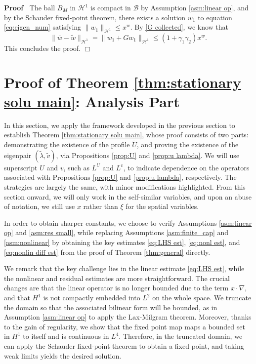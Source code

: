 \documentclass[11pt,a4paper]{article}
\numberwithin{equation}{section}
\newenvironment{proof}{\noindent\textbf{Proof\ }}{\hspace*{\fill}$\Box$\medskip}
\begin{document}
\begin{proof}
    The ball $B_{M}$ in $\mathcal{H}^1$ is compact in $\mathcal{B}$ by Assumption \ref{asm:linear op}, and by the Schauder fixed-point theorem, there exists
  a  solution $w_1$ to equation \eqref{eq:eigen_num} satisfying
  $\| w_1 \|_{\mathcal{H}^1} \leqslant x^w . $ By \eqref{G collected}, we know that $$\| \overline{w} - \widetilde{w} \|_{\mathcal{H}^1}=\| w_1+Gw_1 \|_{\mathcal{H}^1} \leqslant (1+\gamma_1\gamma_2)x^w . $$
  This concludes the proof.
\end{proof}

\section{Proof of Theorem \ref{thm:stationary solu main}: Analysis Part}\label{sec:analysis}

In this section, we apply the framework developed in the previous section to establish Theorem
\ref{thm:stationary solu main}, whose proof consists of two parts: demonstrating the
existence of the profile $\widetilde{U}$, and proving the existence of the
eigenpair $(\widetilde{\lambda}, \widetilde{v})$, via Propositions \ref{prop:U} and \ref{prop:u lambda}.
We will use superscript $U$ and $v$, such as $L^U$ and $L^v$, to indicate dependence on the operators associated with Propositions \ref{prop:U} and \ref{prop:u lambda}, respectively. The strategies are largely the same, with minor modifications highlighted. From this section onward, we will only work in the self-similar variables, and upon an abuse of notation, we still use $x$ rather than $\xi$ for the spatial variables.

\begin{remark}  In order to obtain sharper constants, we choose to 
verify Assumptions \ref{asm:linear op} and \ref{asm:res small}, while
replacing Assumptions \ref{asm:finite_cap} and \ref{asm:nonlinear} by obtaining the
key estimates \eqref{eq:LHS est},  \eqref{eq:nonl est}, and \eqref{eq:nonlin
diff est}  from the proof of Theorem \ref{thm:general} directly.\end{remark} We remark that the key challenge lies in the linear estimate \eqref{eq:LHS est}, while the nonlinear and residual estimates are more straightforward.  The crucial changes are that the linear operator is no longer bounded due to the term $x\cdot\nabla$, and that $H^1$ is not compactly embedded into $L^2$ on the whole space.
We truncate the domain so that the associated bilinear form will be bounded, as in  Assumption \ref{asm:linear op} to apply the Lax-Milgram theorem. Moreover, thanks to the gain of regularity, we show that the fixed point map maps a bounded set in $H^1$ to itself and is continuous in $L^4$. Therefore, in the truncated domain, we can apply the Schauder fixed-point theorem to obtain a fixed point,  and taking weak limits yields the desired solution. 
\end{document}
